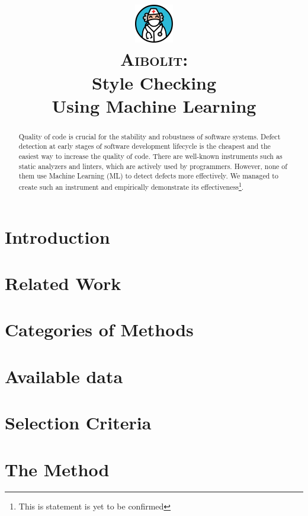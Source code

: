 \documentclass[12pt]{article}
\title{
  \includegraphics[height=48pt]{logo}\\
  \textsc{Aibolit}:\\
  Style Checking\\
  Using Machine Learning}
\begin{document}
\maketitle

\begin{abstract}
Quality of code is crucial for the stability and robustness
of software systems. Defect detection at early stages of
software development lifecycle is the cheapest and the easiest
way to increase the quality of code. There are well-known
instruments such as static analyzers and linters, which are
actively used by programmers. However, none of them use Machine
Learning (ML) to detect defects more effectively. 
We managed to create such an instrument and empirically demonstrate 
its effectiveness\footnote{This is statement is yet to be confirmed}. 
\end{abstract}

\pagebreak

\section{Introduction}


\section{Related Work}
\label{sec:related}


\section{Categories of Methods}
\label{sec:categories}


\section{Available data}
\label{sec:data}


\section{Selection Criteria}
\label{sec:criteria}


\section{The Method}
\label{sec:method}

\end{document}
